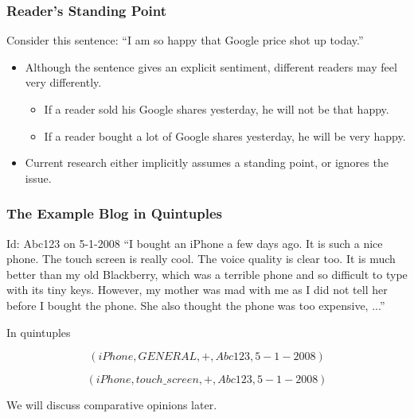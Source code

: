 \documentclass[t]{beamer}
\begin{document}
\begin{frame} \frametitle{Reader's Standing Point} %

\begin{block}{ Consider this sentence:}
``I am so happy that Google price shot up today.''
\end{block}

\begin{itemize}
\item Although the sentence gives an explicit sentiment, different readers may feel very differently.

\begin{itemize}
    \item If a reader sold his Google shares yesterday, he will not be
  that happy. 
    \item If a reader bought a lot of Google shares yesterday, he will be very happy.
\end{itemize}

\item Current research either implicitly assumes a standing point, or ignores the issue.

\end{itemize}

\end{frame} 

\begin{frame} \frametitle{The Example Blog in Quintuples} %

\begin{block}{Id: Abc123 on 5-1-2008 }
``I bought an iPhone a few days ago. It is such a nice phone. The touch screen is really cool. The voice quality is clear too. It is much better than my old Blackberry, which was a terrible phone and so difficult to type with its tiny keys. However, my mother was mad with me as I did not tell her before I bought the phone. She also thought the phone was too expensive, ...''
\end{block}

\begin{block}{In quintuples}

\begin{equation*}
(iPhone, GENERAL, +, Abc123, 5-1-2008) 
\end{equation*}

\begin{equation*}
 (iPhone, touch\_screen, +, Abc123, 5-1-2008) 
\end{equation*}
\end{block}

We will discuss comparative opinions later.
\end{frame} 
\end{document}
